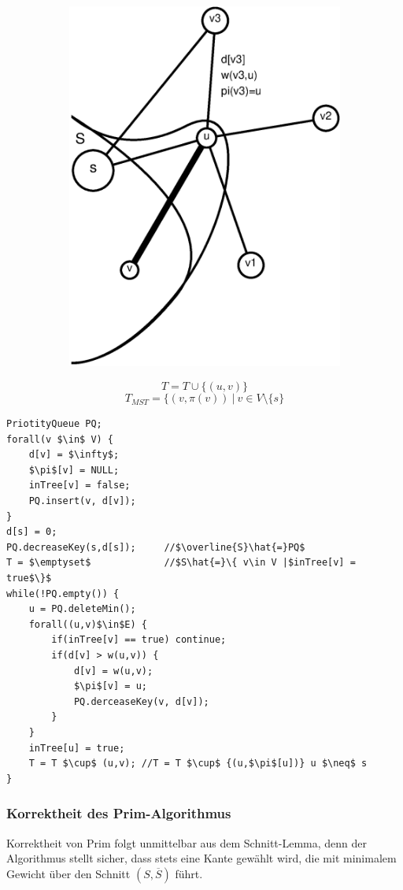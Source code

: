 \begin{figure}[h]
\begin{subfigure}[h]{0.4\textwidth}
	\includegraphics[width=\linewidth]{20/Grafik/img3}
	\caption*{}
	\[ T=T\cup \{ (u,v) \} \]
	\[ T_{MST}=\{ (v,\pi(v))~|~v\in V\setminus\{ s \} \]
\end{subfigure}
\end{figure}

\begin{lstlisting}
PriotityQueue PQ;
forall(v $\in$ V) {
	d[v] = $\infty$;
	$\pi$[v] = NULL;
	inTree[v] = false;
	PQ.insert(v, d[v]);
}
d[s] = 0;
PQ.decreaseKey(s,d[s]);		//$\overline{S}\hat{=}PQ$
T = $\emptyset$				//$S\hat{=}\{ v\in V |$inTree[v] = true$\}$
while(!PQ.empty()) {
	u = PQ.deleteMin();
	forall((u,v)$\in$E) {
		if(inTree[v] == true) continue;
		if(d[v] > w(u,v)) {
			d[v] = w(u,v);
			$\pi$[v] = u;
			PQ.derceaseKey(v, d[v]);
		}
	}
	inTree[u] = true;
	T = T $\cup$ (u,v);	//T = T $\cup$ {(u,$\pi$[u])} u $\neq$ s
}
\end{lstlisting}
\subsubsection{Korrektheit des Prim-Algorithmus}
Korrektheit von Prim folgt unmittelbar aus dem Schnitt-Lemma, denn der Algorithmus stellt sicher, dass stets eine Kante gewählt wird, die mit minimalem Gewicht über den Schnitt $(S,\overline{S})$ führt.
